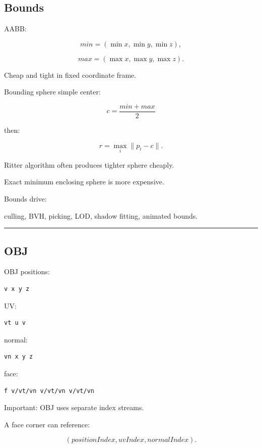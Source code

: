 \subsection{Bounds}\label{04-visual-computing-ii-ch041-bounds}

AABB:

\[
min=
(\min x,\min y,\min z),
\]

\[
max=
(\max x,\max y,\max z).
\]

Cheap and tight in fixed coordinate frame.

Bounding sphere simple center:

\[
c=
\frac{min+max}{2}
\]

then:

\[
r=
\max_i\|p_i-c\|.
\]

Ritter algorithm often produces tighter sphere cheaply.

Exact minimum enclosing sphere is more expensive.

Bounds drive:

culling, BVH, picking, LOD, shadow fitting, animated bounds.

\begin{center}\rule{0.5\linewidth}{0.5pt}\end{center}

\subsection{OBJ}\label{04-visual-computing-ii-ch041-obj}

OBJ positions:

\begin{verbatim}
v x y z
\end{verbatim}

UV:

\begin{verbatim}
vt u v
\end{verbatim}

normal:

\begin{verbatim}
vn x y z
\end{verbatim}

face:

\begin{verbatim}
f v/vt/vn v/vt/vn v/vt/vn
\end{verbatim}

Important: OBJ uses separate index streams.

A face corner can reference:

\[
(positionIndex,
uvIndex,
normalIndex).
\]

